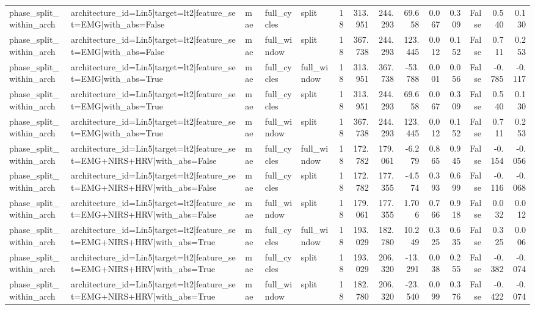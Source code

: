 \begin{table}
\begin{tabular}{lllllrrrrrrrrr}
phase_split_within_arch & architecture_id=Lin5|target=lt2|feature_set=EMG|with_abs=False & mae & full_cycles & split & 18 & 313.951 & 244.293 & 69.658 & 0.067 & 0.309 & False & 0.540 & 0.130 \\
phase_split_within_arch & architecture_id=Lin5|target=lt2|feature_set=EMG|with_abs=False & mae & full_window & split & 18 & 367.738 & 244.293 & 123.445 & 0.012 & 0.152 & False & 0.711 & 0.253 \\
phase_split_within_arch & architecture_id=Lin5|target=lt2|feature_set=EMG|with_abs=True & mae & full_cycles & full_window & 18 & 313.951 & 367.738 & -53.788 & 0.001 & 0.056 & False & -0.785 & -0.117 \\
phase_split_within_arch & architecture_id=Lin5|target=lt2|feature_set=EMG|with_abs=True & mae & full_cycles & split & 18 & 313.951 & 244.293 & 69.658 & 0.067 & 0.309 & False & 0.540 & 0.130 \\
phase_split_within_arch & architecture_id=Lin5|target=lt2|feature_set=EMG|with_abs=True & mae & full_window & split & 18 & 367.738 & 244.293 & 123.445 & 0.012 & 0.152 & False & 0.711 & 0.253 \\
phase_split_within_arch & architecture_id=Lin5|target=lt2|feature_set=EMG+NIRS+HRV|with_abs=False & mae & full_cycles & full_window & 18 & 172.782 & 179.061 & -6.279 & 0.865 & 0.945 & False & -0.154 & -0.056 \\
phase_split_within_arch & architecture_id=Lin5|target=lt2|feature_set=EMG+NIRS+HRV|with_abs=False & mae & full_cycles & split & 18 & 172.782 & 177.355 & -4.574 & 0.393 & 0.699 & False & -0.116 & -0.068 \\
phase_split_within_arch & architecture_id=Lin5|target=lt2|feature_set=EMG+NIRS+HRV|with_abs=False & mae & full_window & split & 18 & 179.061 & 177.355 & 1.706 & 0.766 & 0.918 & False & 0.032 & 0.012 \\
phase_split_within_arch & architecture_id=Lin5|target=lt2|feature_set=EMG+NIRS+HRV|with_abs=True & mae & full_cycles & full_window & 18 & 193.029 & 182.780 & 10.249 & 0.325 & 0.635 & False & 0.325 & 0.006 \\
phase_split_within_arch & architecture_id=Lin5|target=lt2|feature_set=EMG+NIRS+HRV|with_abs=True & mae & full_cycles & split & 18 & 193.029 & 206.320 & -13.291 & 0.038 & 0.255 & False & -0.382 & -0.074 \\
phase_split_within_arch & architecture_id=Lin5|target=lt2|feature_set=EMG+NIRS+HRV|with_abs=True & mae & full_window & split & 18 & 182.780 & 206.320 & -23.540 & 0.099 & 0.376 & False & -0.422 & -0.074 \\

\end{tabular}
\end{table}
